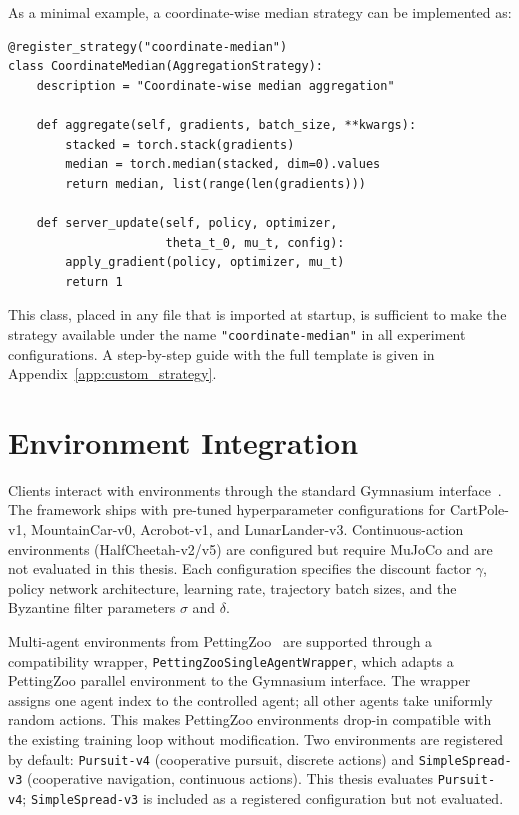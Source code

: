\documentclass[a4paper, oneside]{discothesis}
\begin{document}
As a minimal example, a coordinate-wise median strategy can be implemented as:
\begin{verbatim}
@register_strategy("coordinate-median")
class CoordinateMedian(AggregationStrategy):
    description = "Coordinate-wise median aggregation"

    def aggregate(self, gradients, batch_size, **kwargs):
        stacked = torch.stack(gradients)
        median = torch.median(stacked, dim=0).values
        return median, list(range(len(gradients)))

    def server_update(self, policy, optimizer,
                      theta_t_0, mu_t, config):
        apply_gradient(policy, optimizer, mu_t)
        return 1
\end{verbatim}

This class, placed in any file that is imported at startup, is sufficient to make the strategy available under the name \texttt{"coordinate-median"} in all experiment configurations. A step-by-step guide with the full template is given in Appendix~\ref{app:custom_strategy}.

\section{Environment Integration}
\label{sec:envs}

Clients interact with environments through the standard Gymnasium interface~\cite{OpenAIGym}. The framework ships with pre-tuned hyperparameter configurations for CartPole-v1, MountainCar-v0, Acrobot-v1, and LunarLander-v3. Continuous-action environments (HalfCheetah-v2/v5) are configured but require MuJoCo and are not evaluated in this thesis. Each configuration specifies the discount factor $\gamma$, policy network architecture, learning rate, trajectory batch sizes, and the Byzantine filter parameters $\sigma$ and $\delta$.

Multi-agent environments from PettingZoo~\cite{PettingZoo} are supported through a compatibility wrapper, \texttt{PettingZooSingleAgentWrapper}, which adapts a PettingZoo parallel environment to the Gymnasium interface. The wrapper assigns one agent index to the controlled agent; all other agents take uniformly random actions. This makes PettingZoo environments drop-in compatible with the existing training loop without modification. Two environments are registered by default: \texttt{Pursuit-v4} (cooperative pursuit, discrete actions) and \texttt{SimpleSpread-v3} (cooperative navigation, continuous actions). This thesis evaluates \texttt{Pursuit-v4}; \texttt{SimpleSpread-v3} is included as a registered configuration but not evaluated.
\end{document}
